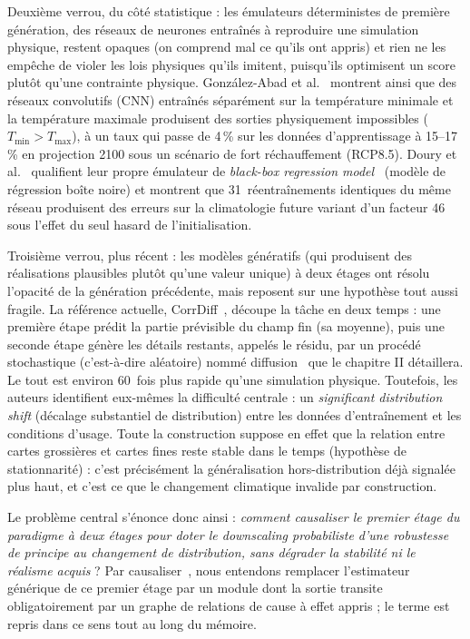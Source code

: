 Deuxième verrou, du côté statistique : les émulateurs déterministes de première génération, des réseaux de neurones entraînés à reproduire une simulation physique, restent opaques (on comprend mal ce qu'ils ont appris) et rien ne les empêche de violer les lois physiques qu'ils imitent, puisqu'ils optimisent un score plutôt qu'une contrainte physique. González-Abad et al.~\cite{gonzalezabad_physical_2023} montrent ainsi que des réseaux convolutifs (CNN) entraînés séparément sur la température minimale et la température maximale produisent des sorties physiquement impossibles ($T_{\min} > T_{\max}$), à un taux qui passe de 4\,\% sur les données d'apprentissage à 15--17\,\% en projection 2100 sous un scénario de fort réchauffement (RCP8.5). Doury et al.~\cite{doury_rcm_emulator_2023} qualifient leur propre émulateur de \og \emph{black-box regression model}~\fg{} (modèle de régression boîte noire) et montrent que 31~réentraînements identiques du même réseau produisent des erreurs sur la climatologie future variant d'un facteur 46 sous l'effet du seul hasard de l'initialisation.

Troisième verrou, plus récent : les modèles génératifs (qui produisent des réalisations plausibles plutôt qu'une valeur unique) à deux étages ont résolu l'opacité de la génération précédente, mais reposent sur une hypothèse tout aussi fragile. La référence actuelle, CorrDiff~\cite{mardani_corrdiff_2023}, découpe la tâche en deux temps : une première étape prédit la partie prévisible du champ fin (sa moyenne), puis une seconde étape génère les détails restants, appelés le résidu, par un procédé stochastique (c'est-à-dire aléatoire) nommé diffusion~\cite{karras_edm_2022} que le chapitre II détaillera. Le tout est environ 60~fois plus rapide qu'une simulation physique. Toutefois, les auteurs identifient eux-mêmes la difficulté centrale : un \emph{significant distribution shift} (décalage substantiel de distribution) entre les données d'entraînement et les conditions d'usage. Toute la construction suppose en effet que la relation entre cartes grossières et cartes fines reste stable dans le temps (hypothèse de stationnarité) : c'est précisément la généralisation hors-distribution déjà signalée plus haut, et c'est ce que le changement climatique invalide par construction.

Le problème central s'énonce donc ainsi : \emph{comment causaliser le premier étage du paradigme à deux étages pour doter le downscaling probabiliste d'une robustesse de principe au changement de distribution, sans dégrader la stabilité ni le réalisme acquis} ? Par \og causaliser~\fg{}, nous entendons remplacer l'estimateur générique de ce premier étage par un module dont la sortie transite obligatoirement par un graphe de relations de cause à effet appris ; le terme est repris dans ce sens tout au long du mémoire.

